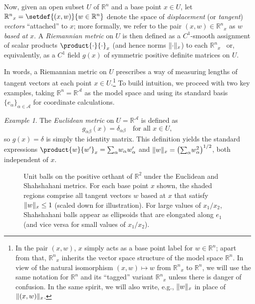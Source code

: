 \documentclass[reqno]{amsart}
\DeclarePairedDelimiter{\norm}{\lVert}{\rVert}
\theoremstyle{plain}
\theoremstyle{definition}
\theoremstyle{remark}
\newtheorem{example}[theorem]{Example}
\numberwithin{equation}{section}
\numberwithin{theorem}{section}
\begin{document}
Now, given an open subset ${U}$ of ${{\mathbb{R}}^{n}}$ and a base point $x\in{U}$, let ${{\mathbb{R}}^{n}}_{x} = \setdef{(x,w)}{w\in{{\mathbb{R}}^{n}}}$ denote the space of \emph{displacement} (or \emph{tangent}) \emph{vectors} ``attached'' to $x$;
more formally, we refer to the pair $(x,w) \in {{\mathbb{R}}^{n}}_{x}$ as \emph{$w$ based at $x$}.
A \emph{Riemannian metric} on ${U}$ is then defined as a $C^{1}$-smooth assignment of scalar products $\product{\mathopen{}\cdot\mathopen{}}{\mathopen{}\cdot\mathopen{}}_{x}$ (and hence norms $\norm{\mathopen{}\cdot\mathopen{}}_{x}$) to each ${{\mathbb{R}}^{n}}_{x}$ \textendash\ or, equivalently, as a $C^{1}$ field $g(x)$ of symmetric positive definite matrices on ${U}$.

In words, a Riemannian metric on ${U}$ prescribes a way of measuring lengths of tangent vectors at each point $x\in{U}$.\footnote{In the pair $(x,w)$, $x$ simply acts as a base point label for $w\in {{\mathbb{R}}^{n}}$;
apart from that, ${{\mathbb{R}}^{n}}_{x}$ inherits the vector space structure of the model space ${{\mathbb{R}}^{n}}$.
In view of the natural isomorphism  $(x,w)\mapsto w$ from ${{\mathbb{R}}^{n}}_{x}$ to ${{\mathbb{R}}^{n}}$, we will use the same notation for ${{\mathbb{R}}^{n}}$ and its ``tagged'' variant ${{\mathbb{R}}^{n}}_{x}$ unless there is danger of confusion.
In the same spirit, we will also write, e.g., $\norm{w}_{x}$ in place of $\norm{(x,w)}_{x}$.}
To build intuition, we proceed with two key examples, taking ${{\mathbb{R}}^{n}} = {\mathbb{R}}^{\mathcal{A}}$ as the model space and using its standard basis $\{{e}_{\alpha}\}_{\alpha\in{\mathcal{A}}}$ for coordinate calculations.

\begin{example}
\label{ex:Eucl}
The \emph{Euclidean metric} on ${U} = {\mathbb{R}}^{\mathcal{A}}$ is defined as
\begin{equation}
\label{eq:Eucl}
g_{\alpha\beta}(x)
	= \delta_{\alpha\beta}
	\quad
	\text{for all $x\in{U}$},
\end{equation}
so $g(x) = \delta$ is simply the identity matrix.
This definition yields the standard expressions $\product{w}{w'}_{x} = {\sum\nolimits}_{\alpha} w_{\alpha} w_{\alpha}'$ and $\norm{w}_{x} = \left({\sum\nolimits}_{\alpha} w_{\alpha}^{2}\right)^{1/2}$, both independent of $x$.
\end{example}

\begin{figure}[t]
\hfill
{}
\caption{\small
Unit balls on the positive orthant of ${\mathbb{R}}^{2}$ under the Euclidean and Shahshahani metrics.
For each base point $x$ shown, the shaded regions comprise all tangent vectors $w$ based at $x$ that  satisfy $\norm{w}_{x} \leq 1$ (scaled down for illustration).
For large values of $x_{1}/x_{2}$, Shahshahani balls appear as ellipsoids that are elongated along ${e}_{1}$ (and vice versa for small values of $x_{1}/x_{2}$).
}
\label{fig:balls-orthant}
\end{figure}
\end{document}
